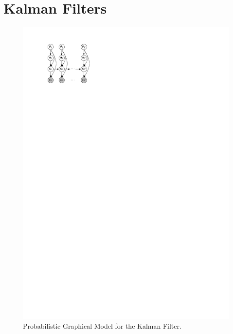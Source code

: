 \section{Kalman Filters}
\begin{figure}[!htb]
\centering
\includegraphics[scale=1]{models/kf/figures/kf}
\caption{Probabilistic Graphical Model for the Kalman Filter.}
\label{fig:models/kf/figures/kf}
\end{figure}





